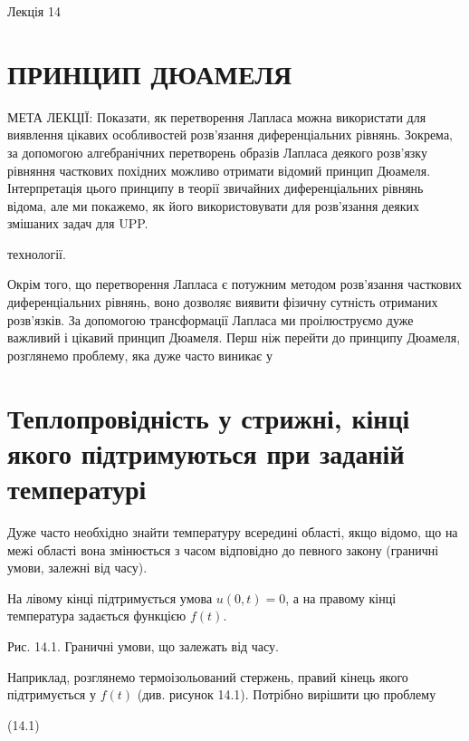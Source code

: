 \documentclass[
  ukrainian,
]{article}
\begin{document}
Лекція 14

\section{ПРИНЦИП
ДЮАМЕЛЯ}\label{ux43fux440ux438ux43dux446ux438ux43f-ux434ux44eux430ux43cux435ux43bux44f}

МЕТА ЛЕКЦІЇ: Показати, як перетворення Лапласа можна використати для
виявлення цікавих особливостей розв'язання диференціальних рівнянь.
Зокрема, за допомогою алгебранічних перетворень образів Лапласа деякого
розв'язку рівняння часткових похідних можливо отримати відомий принцип
Дюамеля. Інтерпретація цього принципу в теорії звичайних диференціальних
рівнянь відома, але ми покажемо, як його використовувати для розв'язання
деяких змішаних задач для UPP.

технології.

Окрім того, що перетворення Лапласа є потужним методом розв'язання
часткових диференціальних рівнянь, воно дозволяє виявити фізичну
сутність отриманих розв'язків. За допомогою трансформації Лапласа ми
проілюструємо дуже важливий і цікавий принцип Дюамеля. Перш ніж перейти
до принципу Дюамеля, розглянемо проблему, яка дуже часто виникає у

\section{Теплопровідність у стрижні, кінці якого підтримуються при
заданій
температурі}\label{ux442ux435ux43fux43bux43eux43fux440ux43eux432ux456ux434ux43dux456ux441ux442ux44c-ux443-ux441ux442ux440ux438ux436ux43dux456-ux43aux456ux43dux446ux456-ux44fux43aux43eux433ux43e-ux43fux456ux434ux442ux440ux438ux43cux443ux44eux442ux44cux441ux44f-ux43fux440ux438-ux437ux430ux434ux430ux43dux456ux439-ux442ux435ux43cux43fux435ux440ux430ux442ux443ux440ux456}

Дуже часто необхідно знайти температуру всередині області, якщо відомо,
що на межі області вона змінюється з часом відповідно до певного закону
(граничні умови, залежні від часу).

На лівому кінці підтримується умова \(u(0,t)=0\), а на правому кінці
температура задається функцією \(f(t)\).

Рис. 14.1. Граничні умови, що залежать від часу.

Наприклад, розглянемо термоізольований стержень, правий кінець якого
підтримується у \(f(t)\) (див. рисунок 14.1). Потрібно вирішити цю
проблему

(14.1)
\end{document}
